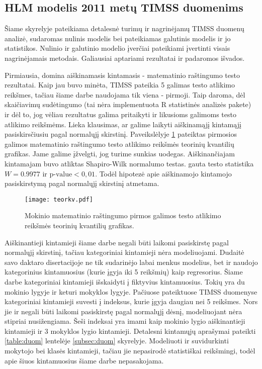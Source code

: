 \documentclass[12pt,a4paper]{article}
\begin{document}
\subsection{HLM modelis 2011 metų TIMSS duomenims}

\indent Šiame skyrelyje pateikiama detalesnė turimų ir nagrinėjamų TIMSS duomenų analizė, sudaromas nulinis modelis bei pateikiamas galutinis modelis ir jo statistikos. Nulinio ir galutinio modelio įverčiai pateikiami įvertinti visais nagrinėjamais metodais. Galiausiai aptariami rezultatai ir padaromos išvados.

\indent Pirmiausia, domina aiškinamasis kintamasis - matematinio raštingumo testo rezultatai. Kaip jau buvo minėta, TIMSS pateikia 5 galimas testo atlikimo reikšmes, tačiau šiame darbe naudojama tik viena - pirmoji. Taip daroma, dėl skaičiavimų sudėtingumo (tai nėra implementuota R statistinės analizės pakete) ir dėl to, jog vėliau rezultatus galima pritaikyti ir likusioms galimoms testo atlikimo reikšmėms. Lieka klausimas, ar galime laikyti aiškinamąjį kintamąjį pasiskirsčiusiu pagal normalųjį skirstinį. Paveikslėlyje \ref{fig:y} pateiktas pirmosios galimos matematinio raštingumo testo atlikimo reikšmės teorinių kvantilių grafikas. Jame galime įžvelgti, jog turime sunkias uodegas. Aiškinančiajam kintamajam buvo atliktas Shapiro-Wilk normalumo testas. gauta testo statistika $W = 0.9977$ ir $\text{p-value}<0,01$. Todėl hipotezė apie aiškinamojo kintamojo pasiskirstymą pagal normalųjį skirstinį atmetama.

\begin{figure}[H]
\centering
\texttt{[image: teorkv.pdf]}
\caption{Mokinio matematinio raštingumo pirmos galimos testo atlikimo reikšmės teorinių kvantilių grafikas.}
\label{fig:y}
\end{figure}

\indent Aiškinantieji kintamieji šiame darbe negali būti laikomi pasiskirstę pagal normalųjį skirstinį, tačiau kategoriniai kintamieji nėra modeliuojami. Dudaitė savo daktaro disertacijoje \cite{liet2003} ne tik sudarinėjo labai menkus modelius, bet ir naudojo kategorinius kintamuosius (kurie įgyja iki 5 reikšmių) kaip regresorius. Šiame darbe kategoriniai kintamieji išskaidyti į fiktyvius kintamuosius. Tokių yra du mokinio lygyje ir keturi mokyklos lygyje. Pačiuose pateiktuose TIMSS duomenyse kategoriniai kintamieji suvesti į indeksus, kurie įgyja daugiau nei 5 reikšmes. Nors jie ir negali būti laikomi pasiskirstę pagal normalųjį dėsnį, modeliuojant nėra stipriai nusižengiama. Šeši indeksai yra imami kaip mokinio lygio aiškinantieji kintamieji ir 3 mokyklos lygio kintamieji. Detalesni kintamųjų aprašymai pateikti \ref{table:duom} lentelėje \ref{subsec:duom} skyrelyje. Modeliuoti ir suvidurkinti mokytojo bei klasės kintamieji, tačiau jie nepasirodė statistiškai reikšmingi, todėl apie šiuos kintamuosius šiame darbe nepasakojama.
\end{document}
